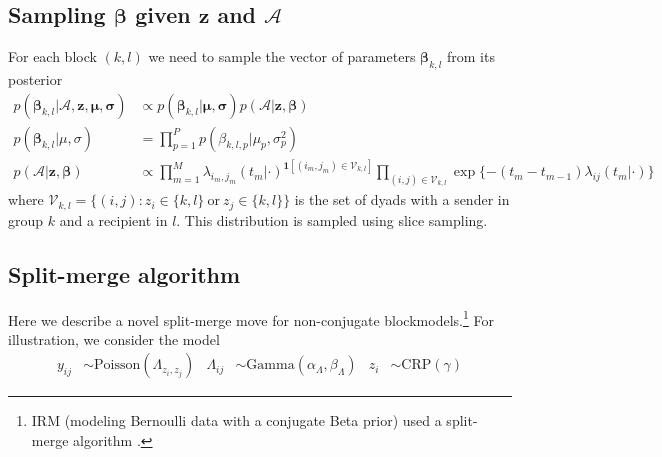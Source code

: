 \documentclass{article}
\begin{document}
\subsection{Sampling $\boldsymbol{\beta}$ given $\mathbf{z}$ and $\mathcal{A}$ }

For each block $(k,l)$ we need to sample the vector of parameters $\boldsymbol{\beta}_{k,l}$ from its posterior
\begin{align*}
p(\boldsymbol{\beta}_{k,l} | \mathcal{A}, \textbf{z}, \boldsymbol{\mu}, \boldsymbol{\sigma}) &\propto p(\boldsymbol{\beta}_{k,l} | \boldsymbol{\mu}, \boldsymbol{\sigma}) p( \mathcal{A}| \textbf{z}, \boldsymbol{\beta}) \\ %
p(\boldsymbol{\beta}_{k,l} | \mu, \sigma) &= \prod_{p=1}^Pp(\beta_{k,l,p}|\mu_p,\sigma_p^2)\\
p(\mathcal{A}|\mathbf{z},\boldsymbol{\beta}) &\propto \prod_{m=1}^M \lambda_{i_m,j_m}(t_m|\cdot)^{\mathbf{1}[(i_m,j_m) \in \mathcal{V}_{k,l}]} 
\prod_{(i,j) \in \mathcal{V}_{k,l}} \exp \{ -(t_m - t_{m-1}) \lambda_{ij}(t_m|\cdot)\}
\end{align*}
where $\mathcal{V}_{k,l} = \{(i,j): z_{i} \in \{k,l\} \ \mbox{or} \ z_{j} \in \{k,l\} \}$ is the set of dyads with a sender in group $k$ and a recipient in $l$.  This distribution is sampled using slice sampling.

\subsection{Split-merge algorithm}


Here we describe a novel split-merge move for non-conjugate blockmodels.\footnote{IRM (modeling Bernoulli data with a conjugate Beta prior) used a split-merge algorithm \cite{Kempe2006}.}  For illustration, we consider the model
\begin{align*}
  y_{ij} & \sim \mbox{Poisson}(\Lambda_{z_i,z_j}) & \Lambda_{ij} &\sim \mbox{Gamma}(\alpha_{\Lambda},\beta_{\Lambda})  & z_i &\sim \mbox{CRP}(\gamma)
\end{align*}
\end{document}
